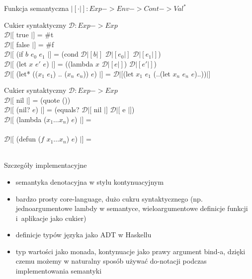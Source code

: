\documentclass[12pt,serif]{beamer}
\begin{document}
\begin{frame}{Funkcja semantyczna}
$|[ \cdot |]: Exp -> Env -> Cont -> Val^{*}$
\end{frame}

\begin{frame}{Cukier syntaktyczny}
$\mathcal{D} : Exp -> Exp$ \newline
\\
$\mathcal{D}|[$ true $|]$ = \#t \\
$\mathcal{D}|[$ false $|]$ = \#f \newline
\\
$\mathcal{D}|[$ (if $b$ $e_0$ $e_1$ $|]$ =
   (cond $\mathcal{D}|[ b |]$ $\mathcal{D}|[ e_0 |]$ $\mathcal{D}|[ e_1 |]$) \newline
\\
$\mathcal{D}|[$ (let $x$ $e'$ $e$) $|]$ =
   ((lambda $x$ $\mathcal{D}|[e|]$) $\mathcal{D}|[e'|]$) \\
$\mathcal{D}|[$ (let* (($x_1$ $e_1$) .. ($x_n$ $e_n$)) $e$) $|]$ = 
   $\mathcal{D}|[$(let $x_1$ $e_1$ (..(let $x_n$ $e_n$ $e$)..))$|]$ \\
\end{frame}

\begin{frame}{Cukier syntaktyczny}
$\mathcal{D} : Exp -> Exp$ \newline
\\
$\mathcal{D}|[$ nil $|]$ = (quote ()) \\
$\mathcal{D}|[$ (nil? $e$) $|]$ = 
   (equals? $\mathcal{D}|[$ nil $|]$ $\mathcal{D}|[$ e $|]$) \newline
\\
$\mathcal{D}|[$ (lambda ($x_1 \ldots x_n$) $e$) $|]$ = \\
\newline
\\
$\mathcal{D}|[$ (defun ($f$ $x_1 \ldots x_n$) $e$) $|]$ = \\ 
\\

\end{frame}


\begin{frame}{Szczegóły implementacyjne}
\begin{itemize}
  \item semantyka denotacyjna w stylu kontynuacyjnym
  \item bardzo prosty core-language, dużo cukru syntaktycznego
        (np. jednoargumentowe lambdy w semantyce,
        wieloargumentowe definicje funkcji i~aplikacje jako cukier)
  \item definicje typów języka jako ADT w Haskellu
  \item typ wartości jako monada, kontynuacje jako prawy argument bind-a,
        dzięki czemu możemy w naturalny sposób używać do-notacji podczas
        implementowania semantyki
\end{itemize}
\end{frame}
\end{document}
